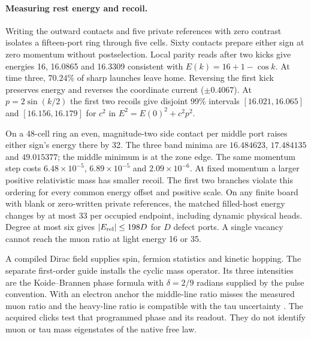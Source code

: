 \paragraph{Measuring rest energy and recoil.}
Writing the outward contacts and five private references with zero
contrast isolates a fifteen-port ring through five cells. Sixty contacts
prepare either sign at zero momentum without postselection. Local
parity reads after two kicks give energies 16, 16.0865 and 16.3309
consistent with $E(k)=16+1-\cos k$. At time three, $70.24\%$ of
sharp launches leave home. Reversing the first kick preserves energy
and reverses the coordinate current ($\pm0.4067$). At $p=2\sin(k/2)$
the first two recoils give disjoint 99\% intervals $[16.021,16.065]$
and $[16.156,16.179]$ for $c^2$ in $E^2=E(0)^2+c^2p^2$.

On a 48-cell ring an even, magnitude-two side contact per middle port
raises either sign's energy there by 32. The three band minima are
$16.484623$, $17.484135$ and $49.015377$; the middle minimum is at
the zone edge. The same momentum step costs $6.48\times10^{-5}$,
$6.89\times10^{-5}$ and $2.09\times10^{-6}$. At fixed momentum a
larger positive relativistic mass has smaller recoil. The first two
branches violate this ordering for every common energy offset and
positive scale. On any finite board with blank or zero-written
private references, the matched filled-host energy changes by at most
33 per occupied endpoint, including dynamic physical heads.
Degree at most six gives $|E_{\rm rel}|\le198D$ for $D$ defect ports.
A single vacancy cannot reach the muon ratio at light energy 16 or 35.

A compiled Dirac field supplies spin, fermion statistics and kinetic
hopping. The separate first-order guide installs the cyclic mass operator.
Its three intensities are the Koide--Brannen phase formula with
$\delta=2/9$ radians supplied by the pulse convention. With an electron
anchor the middle-line ratio misses the measured muon ratio and the
heavy-line ratio is compatible with the tau uncertainty
\cite{codataLepton2022,pdgLepton2026}. The acquired clicks test that
programmed phase and its readout. They do not identify muon or tau mass
eigenstates of the native free law.

